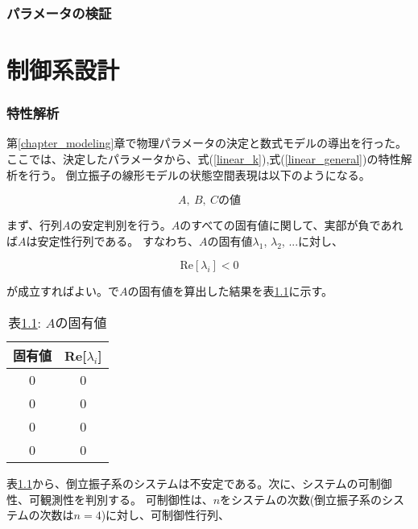 \documentclass[a4j,11pt,twoside]{jbook}
\begin{document}
\subsection{パラメータの検証}


\chapter{制御系設計}
\subsection{特性解析}
第\ref{chapter_modeling}章で物理パラメータの決定と数式モデルの導出を行った。
ここでは、決定したパラメータから、式(\ref{linear_k}),式(\ref{linear_general})の特性解析を行う。
倒立振子の線形モデルの状態空間表現は以下のようになる。

\begin{equation}
    A,\ B,\ Cの値
    \label{ABC}
\end{equation}

まず、行列$A$の安定判別を行う。$A$のすべての固有値に関して、実部が負であれば$A$は安定性行列である。
すなわち、$A$の固有値$\lambda_{1}$, $\lambda_{2}$, $...$に対し、

$$
    \mbox{Re}[\lambda_{i}] < 0
$$

が成立すればよい。\MaTX{}で$A$の固有値を算出した結果を表\ref{eigen_A}に示す。

\begin{table}[htbp]
    \begin{center}
        \caption{表\ref{eigen_A}: $A$の固有値}
        \begin{tabular}{|c|c|} \hline
            固有値 & Re[$\lambda_{i}$] \\ \hline \hline
            0 & 0 \\ \hline
            0 & 0 \\ \hline
            0 & 0 \\ \hline
            0 & 0 \\ \hline
        \end{tabular}
        \label{eigen_A}
    \end{center}
\end{table}

表\ref{eigen_A}から、倒立振子系のシステムは不安定である。次に、システムの可制御性、可観測性を判別する。
可制御性は、$n$をシステムの次数(倒立振子系のシステムの次数は$n = 4$)に対し、可制御性行列、
\end{document}
